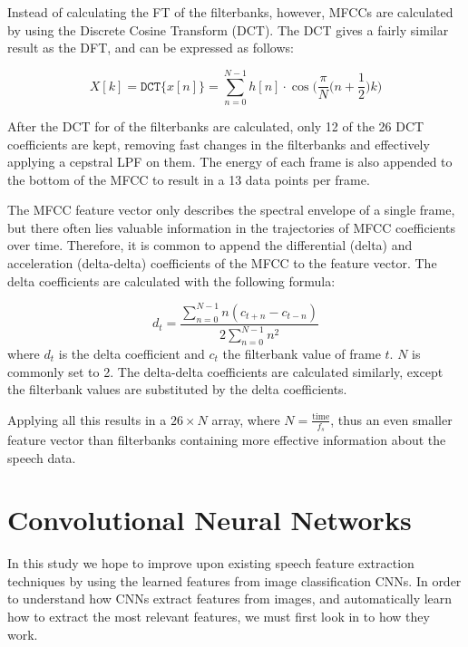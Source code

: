 Instead of calculating the FT of the filterbanks, however, MFCCs are calculated by using the Discrete Cosine Transform (DCT).
The DCT gives a fairly similar result as the DFT, and can be expressed as follows:

\begin{equation}
    X[k] = \mathtt{DCT} \{ x[n] \} = \displaystyle\sum_{n=0}^{N-1} h[n] \cdot \cos\bigg(\displaystyle\frac{\pi}{N}\Big(n+\frac{1}{2}\Big)k\bigg)
\end{equation}

After the DCT for of the filterbanks are calculated, only 12 of the 26 DCT coefficients are kept, removing fast changes in the filterbanks and effectively applying a cepstral LPF on them. 
The energy of each frame is also appended to the bottom of the MFCC to result in a 13 data points per frame.

The MFCC feature vector only describes the spectral envelope of a single frame, but there often lies valuable information in the trajectories of MFCC coefficients over time. 
Therefore, it is common to append the differential (delta) and acceleration (delta-delta) coefficients of the MFCC to the feature vector. 
The delta coefficients are calculated with the following formula:

\begin{equation}
    d_t=\displaystyle\frac{\sum_{n=0}^{N-1} n(c_{t+n}-c_{t-n})}{2\sum_{n=0}^{N-1} n^2}
\end{equation}
where $d_t$ is the delta coefficient and $c_t$ the filterbank value of frame $t$.
$N$ is commonly set to 2. 
The delta-delta coefficients are calculated similarly, except the filterbank values are substituted by the delta coefficients.

Applying all this results in a $26\times N$ array, where $N = \frac{\mathrm{time}}{f_s}$, thus an even smaller feature vector than filterbanks containing more effective information about the speech data.

\section{Convolutional Neural Networks}

In this study we hope to improve upon existing speech feature extraction techniques by using the learned features from image classification CNNs. 
In order to understand how CNNs extract features from images, and automatically learn how to extract the most relevant features, we must first look in to how they work.

